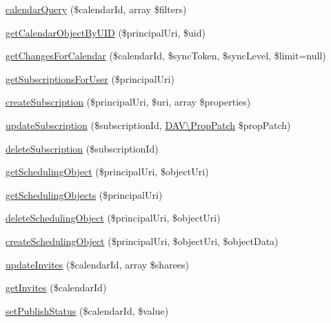 \begin{DoxyCompactItemize}
\item 
\mbox{\hyperlink{class_sabre_1_1_cal_d_a_v_1_1_backend_1_1_p_d_o_a24d741b002fd0b78c313fe377f451de0}{calendar\+Query}} (\$calendar\+Id, array \$filters)
\item 
\mbox{\hyperlink{class_sabre_1_1_cal_d_a_v_1_1_backend_1_1_p_d_o_a7e0e440df7c947c2a356b632eab5cf9a}{get\+Calendar\+Object\+By\+U\+ID}} (\$principal\+Uri, \$uid)
\item 
\mbox{\hyperlink{class_sabre_1_1_cal_d_a_v_1_1_backend_1_1_p_d_o_aed8442b6c016203cfc3cfcb2054938e7}{get\+Changes\+For\+Calendar}} (\$calendar\+Id, \$sync\+Token, \$sync\+Level, \$limit=null)
\item 
\mbox{\hyperlink{class_sabre_1_1_cal_d_a_v_1_1_backend_1_1_p_d_o_a5bf32ef934dfe8d5fa3aff7a8fa918af}{get\+Subscriptions\+For\+User}} (\$principal\+Uri)
\item 
\mbox{\hyperlink{class_sabre_1_1_cal_d_a_v_1_1_backend_1_1_p_d_o_abef71cdfeb5966d776c29678c564f818}{create\+Subscription}} (\$principal\+Uri, \$uri, array \$properties)
\item 
\mbox{\hyperlink{class_sabre_1_1_cal_d_a_v_1_1_backend_1_1_p_d_o_a98f58f61d62e49b93d6005aa346a1193}{update\+Subscription}} (\$subscription\+Id, \mbox{\hyperlink{class_sabre_1_1_d_a_v_1_1_prop_patch}{D\+A\+V\textbackslash{}\+Prop\+Patch}} \$prop\+Patch)
\item 
\mbox{\hyperlink{class_sabre_1_1_cal_d_a_v_1_1_backend_1_1_p_d_o_a488f713803707880811da6f25e91f8fd}{delete\+Subscription}} (\$subscription\+Id)
\item 
\mbox{\hyperlink{class_sabre_1_1_cal_d_a_v_1_1_backend_1_1_p_d_o_a4d36102c345935a0b551df8d82b8a089}{get\+Scheduling\+Object}} (\$principal\+Uri, \$object\+Uri)
\item 
\mbox{\hyperlink{class_sabre_1_1_cal_d_a_v_1_1_backend_1_1_p_d_o_a5b4d2c074e5e46b44d3a439ae94d7fd8}{get\+Scheduling\+Objects}} (\$principal\+Uri)
\item 
\mbox{\hyperlink{class_sabre_1_1_cal_d_a_v_1_1_backend_1_1_p_d_o_af842881c8a8ee265bb8cca7be1f0df14}{delete\+Scheduling\+Object}} (\$principal\+Uri, \$object\+Uri)
\item 
\mbox{\hyperlink{class_sabre_1_1_cal_d_a_v_1_1_backend_1_1_p_d_o_a4d7732130b33406010020eee767e96a1}{create\+Scheduling\+Object}} (\$principal\+Uri, \$object\+Uri, \$object\+Data)
\item 
\mbox{\hyperlink{class_sabre_1_1_cal_d_a_v_1_1_backend_1_1_p_d_o_a37cf70c0f916674df4caac89a9d99afb}{update\+Invites}} (\$calendar\+Id, array \$sharees)
\item 
\mbox{\hyperlink{class_sabre_1_1_cal_d_a_v_1_1_backend_1_1_p_d_o_afea8ccfdf65568def62aed599be0012c}{get\+Invites}} (\$calendar\+Id)
\item 
\mbox{\hyperlink{class_sabre_1_1_cal_d_a_v_1_1_backend_1_1_p_d_o_a2a195c083c83052daed9557a7e9227fa}{set\+Publish\+Status}} (\$calendar\+Id, \$value)
\end{DoxyCompactItemize}
